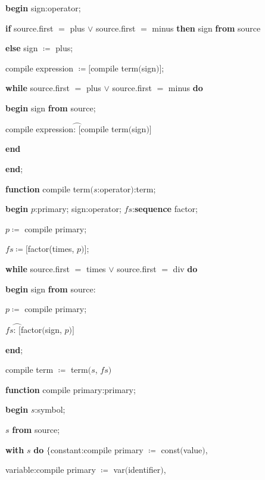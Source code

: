 \noindent
\quad \textbf{begin} sign:operator;

\noindent
\quad \quad \textbf{if} source.first $=$ plus $\vee$ source.first $=$ minus \textbf{then} sign \textbf{from} source

\noindent
\quad \quad \textbf{else} sign $\coloneq$ plus;

\noindent
\quad \quad compile expression $\coloneq [$compile term$($sign$)]$;

\noindent
\quad \quad \textbf{while} source.first $=$ plus $\vee$ source.first $=$ minus \textbf{do}

\noindent
\quad \quad \quad \textbf{begin} sign \textbf{from} source;

\noindent
\quad \quad \quad \quad compile expression$\wideparen{\text{:\ }[}$compile term$($sign$)]$

\noindent
\quad \quad \quad \textbf{end}

\noindent
\quad \textbf{end};

\noindent
\textbf{function} compile term$(s$:operator$)$:term;

\noindent
\quad \textbf{begin} $p$:primary; sign:operator; $fs$:\textbf{sequence} factor;

\noindent
\quad \quad $p\coloneq$ compile primary;

\noindent
\quad \quad $fs \coloneq [$factor(times, $p)]$;

\noindent
\quad \quad \textbf{while} source.first $=$ times $\vee$ source.first $=$ div \textbf{do}

\noindent
\quad \quad \quad \textbf{begin} sign \textbf{from} source:

\noindent
\quad \quad \quad \quad $p\coloneq$ compile primary;

\noindent
\quad \quad \quad \quad $fs\wideparen{\text{: }[}$factor$($sign, $p)]$

\noindent
\quad \quad \quad \textbf{end};

\noindent
\quad \quad compile term $\coloneq$ term$(s$, $fs)$

\noindent
\textbf{function} compile primary:primary;

\noindent
\quad \textbf{begin} $s$:symbol;

\noindent
\quad \quad $s$ \textbf{from} source;

\noindent
\quad \quad \textbf{with} $s$ \textbf{do} $\{$constant:compile primary $\coloneq$ const$($value$)$,

\noindent
\quad \quad \quad variable:compile primary $\coloneq$ var$($identifier$)$,

